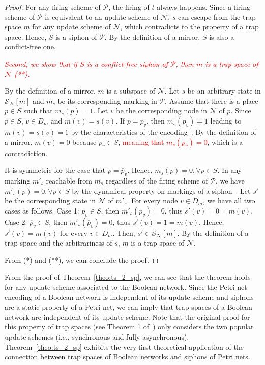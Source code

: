 \documentclass[preprint,12pt]{elsarticle}
\newcommand{\change}[1]{\textcolor{red}{#1}}
\begin{document}
\begin{proof}
  For any firing scheme of \(\mathcal{P}\), the firing of \(t\) always happens.
  Since a firing scheme of \(\mathcal{P}\) is equivalent to an update scheme of \(\mathcal{N}\), \(s\) can escape from the trap space \(m\) for any update scheme of \(\mathcal{N}\), which contradicts to the property of a trap space.
  Hence, \(S\) is a siphon of \(\mathcal{P}\).
  By the definition of a mirror, \(S\) is also a conflict-free one.

  \change{\textit{Second, we show that if \(S\) is a conflict-free siphon of \(\mathcal{P}\), then \(m\) is a trap space of \(\mathcal{N}\) (**).}}

  By the definition of a mirror, \(m\) is a subspace of \(\mathcal{N}\).
  Let \(s\) be an arbitrary state in \(\mathcal{S}_{\mathcal{N}}[m]\) and \(m_s\) be its corresponding marking in \(\mathcal{P}\).
  Assume that there is a place \(p \in S\) such that \(m_s(p) = 1\).
  Let \(v\) be the corresponding node in \(\mathcal{N}\) of \(p\).
  Since \(p \in S\), \(v \in D_m\) and \(m(v) = s(v)\).
  If \(p = p_{v}\), then \(m_s(p_{v}) = 1\) leading to \(m(v) = s(v) = 1\) by the characteristics of the encoding~\cite{chaouiya2004qualitative}.
  By the definition of a mirror, \(m(v) = 0\) because \(p_{v} \in S\), \change{meaning that \(m_s(p_{v}) = 0\)}, which is a contradiction.

  It is symmetric for the case that \(p = \overline{p}_{v}\).
  Hence, \(m_s(p) = 0, \forall p \in S\).
  In any marking \(m'_s\) reachable from \(m_s\) regardless of the firing scheme of \(\mathcal{P}\), we have \(m'_s(p) = 0, \forall p \in S\) by the dynamical property on markings of a siphon~\cite{DBLP:journals/isci/LiuB16}.
  Let \(s'\) be the corresponding state in \(\mathcal{N}\) of \(m'_s\).
  For every node \(v \in D_m\), we have all two cases as follows.
  Case 1: \(p_v \in S\), then \(m'_s(p_v) = 0\), thus \(s'(v) = 0 = m(v)\).
  Case 2: \(\overline{p}_v \in S\), then \(m'_s(\overline{p}_v) = 0\), thus \(s'(v) = 1 = m(v)\).
  Hence, \(s'(v) = m(v)\) for every \(v \in D_m\).
  Then, \(s' \in \mathcal{S}_{\mathcal{N}}[m]\).
  By the definition of a trap space and the arbitrariness of \(s\), \(m\) is a trap space of \(\mathcal{N}\).

  From (*) and (**), we can conclude the proof.
\end{proof}

From the proof of Theorem~\ref{theo:ts_2_sp}, we can see that the theorem holds for any update scheme associated to the Boolean network.
Since the Petri net encoding of a Boolean network is independent of its update scheme and siphons are a static property of a Petri net, we can imply that trap spaces of a Boolean network are independent of its update scheme.
Note that the original proof for this property of trap spaces (see Theorem 1 of~\cite{klarner2015computing}) only considers the two popular update schemes (i.e., synchronous and fully asynchronous).
Theorem~\ref{theo:ts_2_sp} exhibits the very first theoretical application of the connection between trap spaces of Boolean networks and siphons of Petri nets.
\end{document}
